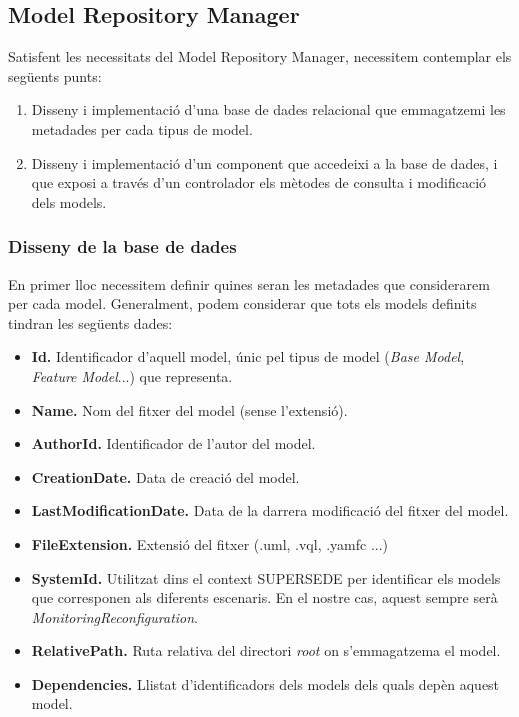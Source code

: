 \subsection{Model Repository Manager}

Satisfent les necessitats del Model Repository Manager, necessitem contemplar els següents punts:

\begin{enumerate}
\item Disseny i implementació d'una base de dades relacional que emmagatzemi les metadades per cada tipus de model.
\item Disseny i implementació d'un component que accedeixi a la base de dades, i que exposi a través d'un controlador els mètodes de consulta i modificació dels models.
\end{enumerate}

\subsubsection{Disseny de la base de dades}

En primer lloc necessitem definir quines seran les metadades que considerarem per cada model. Generalment, podem considerar que tots els models definits tindran les següents dades:

\begin{itemize}
\item \textbf{Id.} Identificador d'aquell model, únic pel tipus de model (\textit{Base Model}, \textit{Feature Model}...) que representa.
\item \textbf{Name.} Nom del fitxer del model (sense l'extensió).
\item \textbf{AuthorId.} Identificador de l'autor del model.
\item \textbf{CreationDate.} Data de creació del model.
\item \textbf{LastModificationDate.} Data de la darrera modificació del fitxer del model.
\item \textbf{FileExtension.} Extensió del fitxer (.uml, .vql, .yamfc ...)
\item \textbf{SystemId.} Utilitzat dins el context SUPERSEDE per identificar els models que corresponen als diferents escenaris. En el nostre cas, aquest sempre serà \textit{MonitoringReconfiguration}.
\item \textbf{RelativePath.} Ruta relativa del directori \textit{root} on s'emmagatzema el model.
\item \textbf{Dependencies.} Llistat d'identificadors dels models dels quals depèn aquest model.
\end{itemize}


